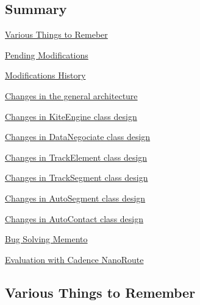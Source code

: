 \hypertarget{pageNotes_Summary}{}\subsection{Summary}\label{pageNotes_Summary}

\begin{DoxyItemize}
\item \hyperlink{pageNotes_ssecVariousNotes}{Various Things to Remeber}
\item \hyperlink{pageNotes_secPendingModifications}{Pending Modifications}
\item \hyperlink{pageNotes_secModificationsHistory}{Modifications History}
\item \hyperlink{pageNotes_ssecArchitectureChanges}{Changes in the general architecture}
\begin{DoxyItemize}
\item \hyperlink{pageNotes_ssecModificationsKiteEngine}{Changes in Kite\-Engine class design}
\item \hyperlink{pageNotes_ssecModificationsDataNegociate}{Changes in Data\-Negociate class design}
\item \hyperlink{pageNotes_ssecModificationsTrackElement}{Changes in Track\-Element class design}
\item \hyperlink{pageNotes_ssecModificationsTrackSegment}{Changes in Track\-Segment class design}
\item \hyperlink{pageNotes_ssecModificationsAutoSegment}{Changes in Auto\-Segment class design}
\item \hyperlink{pageNotes_ssecModificationsAutoContact}{Changes in Auto\-Contact class design}
\end{DoxyItemize}
\item \hyperlink{pageNotes_ssecBugBusting}{Bug Solving Memento}
\item \hyperlink{pageNotes_ssecNanoRoute}{Evaluation with Cadence Nano\-Route}
\end{DoxyItemize}\hypertarget{pageNotes_ssecVariousNotes}{}\subsection{Various Things to Remember}\label{pageNotes_ssecVariousNotes}

